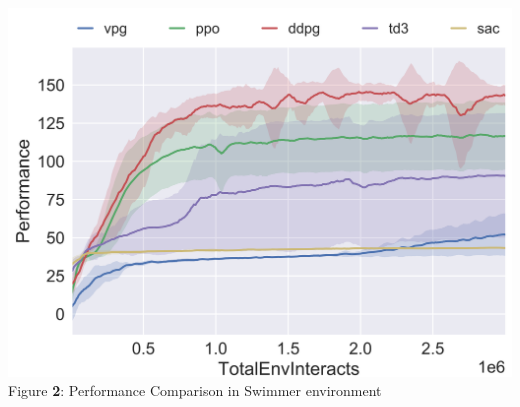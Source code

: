\documentclass[oneside,11pt,a4paper]{article}
\begin{document}
\begin{center}
    \includegraphics[scale=.2]{pytorch_swimmer_performance.png}\\
    Figure \textbf{2}: Performance Comparison in Swimmer environment
\end{center}

\vspace{0.5cm}
\end{document}
